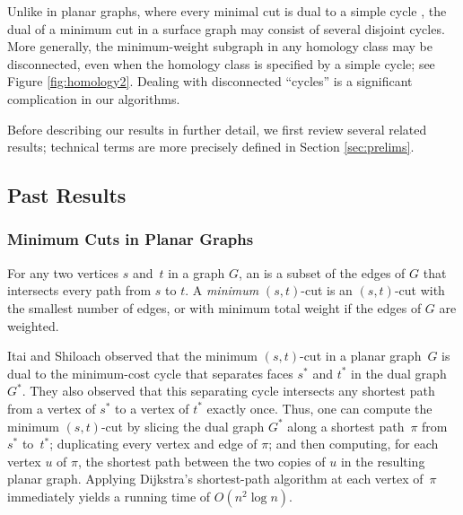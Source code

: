 \documentclass[11pt,twoside]{article}
\begin{document}
Unlike in planar graphs, where every minimal cut is  dual to a simple cycle \cite{w-pg-33}, the dual of a minimum cut in a surface graph may consist of several disjoint cycles.  More generally, the minimum-weight subgraph in any homology class may be disconnected, even when the homology class is specified by a simple cycle; see Figure \ref{fig:homology2}.  Dealing with disconnected “cycles” is a significant complication in our algorithms.

Before describing our results in further detail, we first review several related results; technical terms are more precisely defined in Section \ref{sec:prelims}.


\subsection{Past Results}

\subsubsection*{Minimum Cuts in Planar Graphs}

For any two vertices $s$ and~$t$ in a graph $G$, an  is a subset of the edges of $G$ that intersects every path from $s$ to $t$.  A \emph{minimum} $(s,t)$-cut is an $(s,t)$-cut with the smallest number of edges, or with minimum total weight if the edges of $G$ are weighted.

Itai and Shiloach \cite{is-mfpn-79} observed that the minimum $(s,t)$-cut in a planar graph~$G$ is dual to the minimum-cost cycle that separates faces $s^*$ and $t^*$ in the dual graph $G^*$.  They also observed that this separating cycle intersects any shortest path from a vertex of $s^*$ to a vertex of $t^*$ exactly once.  Thus, one can compute the minimum $(s,t)$-cut by slicing the dual graph $G^*$ along a shortest path~$\pi$ from $s^*$ to~$t^*$; duplicating every vertex and edge of $\pi$; and then computing, for each vertex $u$ of $\pi$, the shortest path between the two copies of $u$ in the resulting planar graph.  Applying Dijkstra's shortest-path algorithm at each vertex of~$\pi$ immediately yields a running time of $O(n^2\log n)$.
\end{document}
